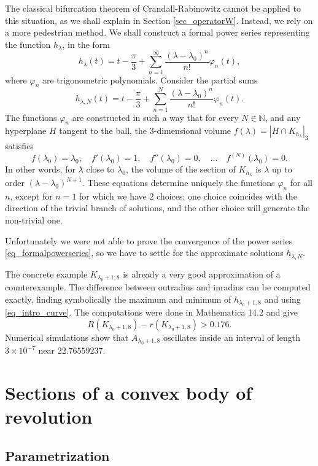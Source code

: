 \documentclass{amsart}
\def \N{\mathbb N}
\newcommand \vol[2][3]{\left|#2\right|_{#1}}
\begin{document}
The classical bifurcation theorem of Crandall-Rabinowitz cannot be applied to this situation, as we shall explain in Section \ref{sec_operatorW}. Instead, we rely on a more pedestrian method.
We shall construct a formal power series representing the function $h_\lambda$, in the form
\begin{equation}
	\label{eq_formalpowerseries}
	h_{\lambda}(t) = t - \frac \pi 3 + \sum_{n=1}^\infty \frac{(\lambda-\lambda_0)^n}{n!} \varphi_n(t),
\end{equation}
where $\varphi_n$ are trigonometric polynomials.
Consider the partial sums
\[h_{\lambda,N}(t) = t - \frac \pi 3 + \sum_{n=1}^N \frac{(\lambda-\lambda_0)^n}{n!} \varphi_n(t).\]
The functions $\varphi_n$ are constructed in such a way that for every $N \in \N$, and any hyperplane $H$ tangent to the ball, 
the $3$-dimensional volume $f(\lambda) = \vol{H \cap K_{h_\lambda}}$ satisfies
\[
	f(\lambda_0)=\lambda_0, \quad f'(\lambda_0) = 1, \quad f''(\lambda_0)=0, \quad \ldots  \quad f^{(N)}(\lambda_0) = 0.
\]
In other words, for $\lambda$ close to $\lambda_0$, the volume of the section of $K_{h_\lambda}$ is $\lambda$ up to order $(\lambda-\lambda_0)^{N+1}$.
These equations determine uniquely the functions $\varphi_n$ for all $n$, except for $n=1$ for which we have $2$ choices; one choice coincides with the direction of the trivial branch of solutions, and the other choice will generate the non-trivial one.

Unfortunately we were not able to prove the convergence of the power series \eqref{eq_formalpowerseries}, so we have to settle for the approximate solutions $h_{\lambda, N}$.

The concrete example $K_{\lambda_0+1, 8}$ is already a very good approximation of a counterexample.
		The difference between outradius and inradius can be computed exactly, finding symbolically the maximum and minimum of $h_{\lambda_0+1,8}$ and using \eqref{eq_intro_curve}. The computations were done in Mathematica 14.2 and give
		\[R(K_{\lambda_0+1,8}) - r(K_{\lambda_0+1,8}) > 0.176.\]
		Numerical simulations show that $A_{\lambda_0+1,8}$ oscillates inside an interval of length $3 \times 10^{-7}$ near $22.76559237$.


\section{Sections of a convex body of revolution}

\subsection{Parametrization}
\label{sec_param}
\end{document}
